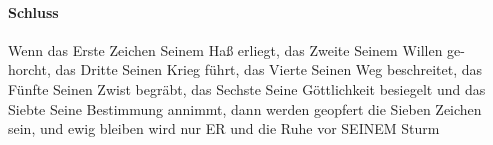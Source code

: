 \paragraph{Schluss} Wenn das Erste Zeichen Seinem Haß erliegt, das Zweite Seinem Willen ge- horcht, das Dritte Seinen Krieg führt, das Vierte Seinen Weg beschreitet, das Fünfte Seinen Zwist begräbt, das Sechste Seine Göttlichkeit besiegelt und das Siebte Seine Bestimmung annimmt, dann werden geopfert die Sieben Zeichen sein, und ewig bleiben wird nur ER und die Ruhe vor SEINEM Sturm

